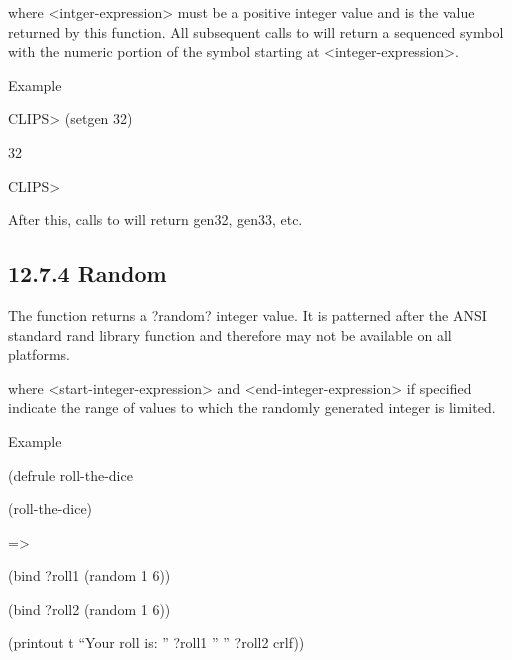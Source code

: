 \documentclass[letterpaper,10pt,english]{sphinxmanual}
\begin{document}
where \textless{}intger-expression\textgreater{} must be a positive integer value and is the
value returned by this function. All subsequent calls to  will
return a sequenced symbol with the numeric portion of the symbol
starting at \textless{}integer-expression\textgreater{}.

Example

CLIPS\textgreater{} (setgen 32)

32

CLIPS\textgreater{}

After this, calls to  will return gen32, gen33, etc.


\subsection{12.7.4 Random}
\label{\detokenize{actions:random}}
The  function returns a ?random? integer value. It is
patterned after the ANSI standard rand library function and therefore
may not be available on all platforms.


\begin{sphinxVerbatim}[commandchars=\\\{\}]
 \PYG{p}{[} \PYG{p}{]}
\end{sphinxVerbatim}

where \textless{}start-integer-expression\textgreater{} and \textless{}end-integer-expression\textgreater{} if
specified indicate the range of values to which the randomly generated
integer is limited.

Example

\begin{DUlineblock}{0em}
\item[] (defrule roll-the-dice
\item[] (roll-the-dice)
\item[] =\textgreater{}
\end{DUlineblock}

(bind ?roll1 (random 1 6))

(bind ?roll2 (random 1 6))

(printout t “Your roll is: ” ?roll1 ” ” ?roll2 crlf))
\end{document}

